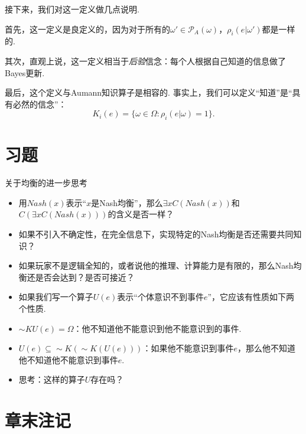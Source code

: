 接下来，我们对这一定义做几点说明. 

首先，这一定义是良定义的，因为对于所有的$\omega'\in\mathcal P_A(\omega)$，$\rho_i(e|\omega')$都是一样的.

其次，直观上说，这一定义相当于\textit{后验}信念：每个人根据自己知道的信息做了Bayes更新.

最后，这个定义与Aumann知识算子是相容的. 事实上，我们可以定义“知道”是“具有必然的信念”：
\[K_i(e)=\{\omega\in\Omega:\rho_i(e|\omega) = 1\}.\]

\section{习题}

    {关于均衡的进一步思考}
\begin{itemize}
    \item 用$Nash(x)$表示“$x$是Nash均衡”，那么$\exists x C(Nash(x))$和$C(\exists x C(Nash(x)))$的含义是否一样？
    \item 如果不引入不确定性，在完全信息下，实现特定的Nash均衡是否还需要共同知识？
    \item 如果玩家不是逻辑全知的，或者说他的推理、计算能力是有限的，那么Nash均衡还是否会达到？是否可接近？
\end{itemize}

\begin{itemize}
    \item 如果我们写一个算子$U(e)$表示“个体意识不到事件$e$”，它应该有性质如下两个性质. 
    \item $\sim KU(e)=\Omega$：他不知道他不能意识到他不能意识到的事件.
    \item $U(e)\subseteq \sim K(\sim K(U(e)))$：如果他不能意识到事件$e$，那么他不知道他不知道他不能意识到事件$e$.
    \item 思考：这样的算子$U$存在吗？
\end{itemize}

\section{章末注记}